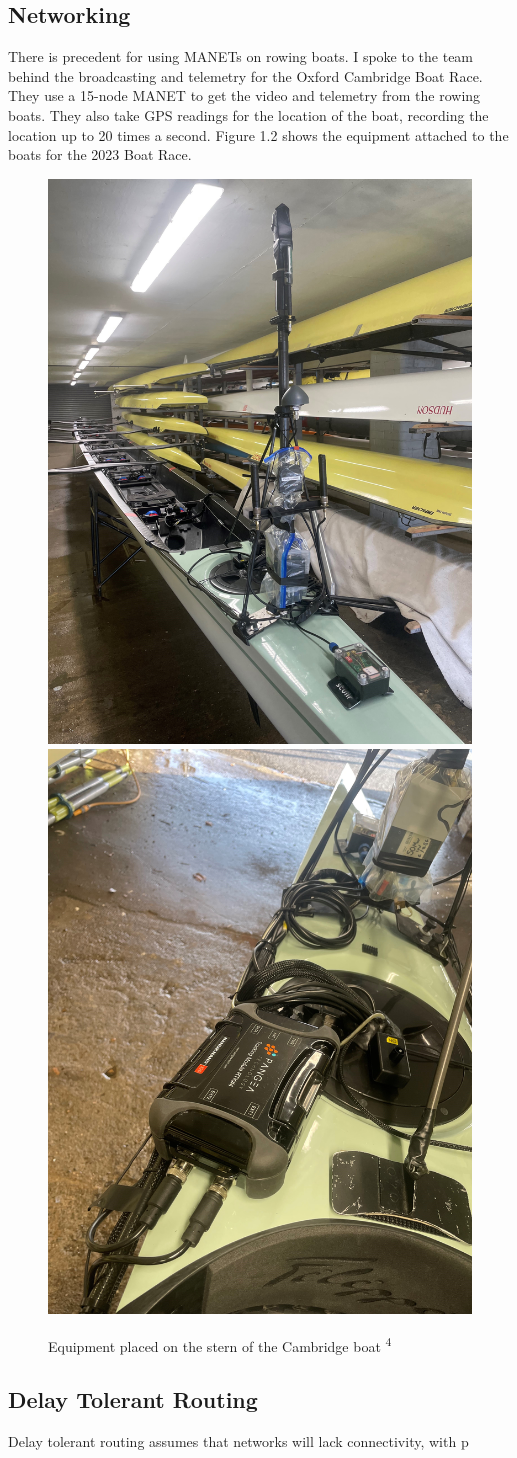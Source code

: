 \documentclass[12pt,a4paper]{report}
\begin{document}
\subsection{Networking}
There is precedent for using MANETs on rowing boats. I spoke to the team behind the broadcasting and telemetry for the Oxford Cambridge Boat Race. They use a 15-node MANET to get the video and telemetry from the rowing boats. They also take GPS readings for the location of the boat, recording the location up to 20 times a second. Figure 1.2 shows the equipment attached to the boats for the 2023 Boat Race.  
\begin{figure}[h]
\begin{center}
\includegraphics[scale=0.07]{boatrace1.jpg}           \includegraphics[scale=0.07]{boatrace2.jpg}
\end{center}
\caption{Equipment placed on the stern of the Cambridge boat \textsuperscript{4} }
\end{figure}


\subsection{Delay Tolerant Routing}
Delay tolerant routing assumes that networks will lack connectivity, with p
\end{document}
